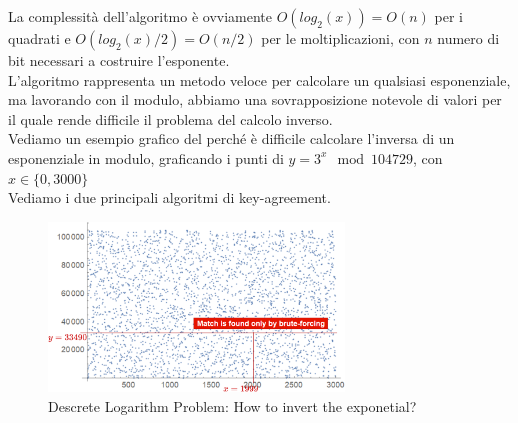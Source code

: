 La complessità dell'algoritmo è ovviamente $O(log_2(x))=O(n)$ per i quadrati e $O(log_2(x)/2)=O(n/2)$ per le moltiplicazioni, con $n$ numero di bit necessari a costruire l'esponente.\\
L'algoritmo rappresenta un metodo veloce per calcolare un qualsiasi esponenziale, ma lavorando con il modulo, abbiamo una sovrapposizione notevole di valori per il quale rende difficile il problema del calcolo inverso.\\
Vediamo un esempio grafico del perché è difficile calcolare l'inversa di un esponenziale in modulo, graficando i punti di $y=3^x\mod104729$, con $x\in\{0,3000\}$\\
Vediamo i due principali algoritmi di key-agreement.
\begin{figure}[ht]
    \centering
    \includegraphics[width=0.7\textwidth]{image/descretelog.png}
    \caption{Descrete Logarithm Problem: How to invert the exponetial?}
    \label{fig:descretelog}
\end{figure}
